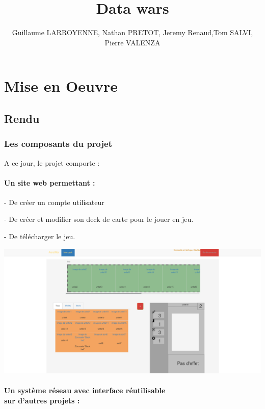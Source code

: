 \documentclass[a4paper,11pt]{report}
\title{Data wars}
\author{Guillaume LARROYENNE, Nathan PRETOT, Jeremy Renaud,Tom SALVI, Pierre VALENZA}
\begin{document}
\maketitle
\tableofcontents

\begin{abstract}
\end{abstract}

\chapter{Mise en Oeuvre}



\section{Rendu}
\subsection{Les composants du projet}
A ce jour, le projet comporte :

	\subsubsection{Un site web permettant :}
	
	 - De créer un compte utilisateur
		 
	 - De créer et modifier son deck de carte pour le jouer en jeu.
	 
	 - De télécharger le jeu.
	 
	 \begin{center}
	\includegraphics[scale=0.2]{Assets/site.png} 
	\end{center}

	
	\subsubsection{Un système réseau avec interface réutilisable\\ sur d'autres 			projets :}
	
\end{document}
